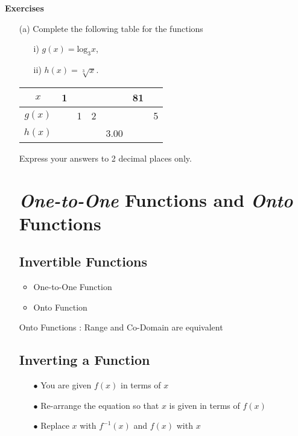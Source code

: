 \documentclass[a4paper,12pt]{article}
\begin{document}
\textbf{Exercises}
\begin{itemize}
\item[(a)] 
Complete the following table for the functions 
\begin{itemize}
\item[i)] $g(x) = \mbox{log}_3x$,
\item[ii)] $h(x) =\sqrt[3]{x}$.
\end{itemize} 
\begin{center}

\begin{tabular}{|c||c|c|c|c|c|c|}
\hline $x$ &  \phantom{p}1\phantom{p}&  &  &  & 81 &  \\ 
\hline \phantom{p} $g(x)$ \phantom{p}&  & \phantom{p}1\phantom{p} & \phantom{p}2\phantom{p} &  &  &  \phantom{p}5\phantom{p} \\ 
\hline \phantom{p}$h(x)$ \phantom{p}&  &  &  &  3.00 & \phantom{p}\phantom{p}\phantom{p}  &  \\ 
\hline 
\end{tabular} 
\end{center}

Express your answers to 2 decimal places only.

\newpage
\section{\textit{One-to-One} Functions and \textit{Onto} Functions}

\subsection{Invertible Functions}
\begin{itemize}
\item One-to-One Function
\item Onto Function
\end{itemize}

Onto Functions : Range and Co-Domain are equivalent

\subsection{Inverting a Function}

\begin{itemize}
\item[$\bullet$] You are given $f(x)$ in terms of $x$
\item[$\bullet$] Re-arrange the equation so that $x$ is given in terms of $f(x)$
\item[$\bullet$] Replace $x$ with $f^{-1}(x)$ and $f(x)$ with $x$
\end{itemize}


\end{itemize}
\end{document}
